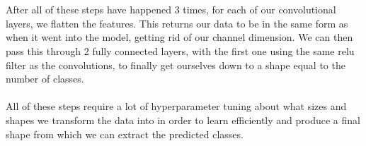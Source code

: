 \documentclass[12pt,a4paper]{article}
\begin{document}
    \\
    \\
    After all of these steps have happened 3 times, for each of our convolutional layers, we flatten the features.
    This returns our data to be in the same form as when it went into the model, getting rid of our channel dimension.
    We can then pass this through 2 fully connected layers, with the first one using the same relu filter as the convolutions, 
    to finally get ourselves down to a shape equal to the number of classes.
    \\
    \\
    All of these steps require a lot of hyperparameter tuning about what sizes and shapes we transform the
    data into in order to learn efficiently and produce a final shape from which we can extract the predicted
    classes.
\end{document}
